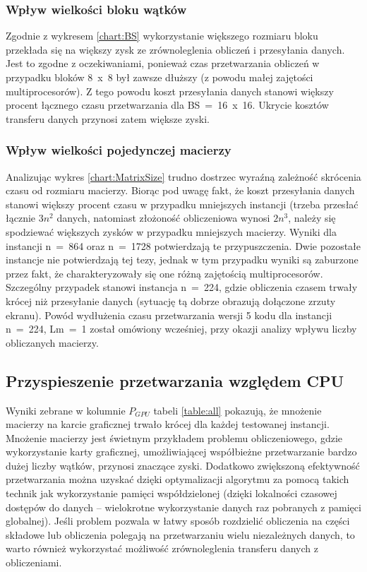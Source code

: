 \documentclass[12pt,a4paper]{article}
\begin{document}
\subsubsection*{Wpływ wielkości bloku wątków}

Zgodnie z wykresem \ref{chart:BS} wykorzystanie większego rozmiaru bloku przekłada się na większy zysk ze zrównoleglenia obliczeń i przesyłania danych. Jest to zgodne z oczekiwaniami, ponieważ czas przetwarzania obliczeń w przypadku bloków 8~x~8 był zawsze dłuższy (z powodu małej zajętości multiprocesorów). Z tego powodu koszt przesyłania danych stanowi większy procent łącznego czasu przetwarzania dla BS~=~16~x~16. Ukrycie kosztów transferu danych przynosi zatem większe zyski.

\subsubsection*{Wpływ wielkości pojedynczej macierzy}

Analizując wykres \ref{chart:MatrixSize} trudno dostrzec wyraźną zależność skrócenia czasu od rozmiaru macierzy. Biorąc pod uwagę fakt, że koszt przesyłania danych stanowi większy procent czasu w przypadku mniejszych instancji (trzeba przesłać łącznie $3n^2$ danych, natomiast złożoność obliczeniowa wynosi $2n^3$, należy się spodziewać większych zysków w przypadku mniejszych macierzy. Wyniki dla instancji n~=~864 oraz n~=~1728 potwierdzają te przypuszczenia. Dwie pozostałe instancje nie potwierdzają tej tezy, jednak w tym przypadku wyniki są zaburzone przez fakt, że charakteryzowały się one różną zajętością multiprocesorów. Szczególny przypadek stanowi instancja n~=~224, gdzie obliczenia czasem trwały krócej niż przesyłanie danych (sytuację tą dobrze obrazują dołączone zrzuty ekranu). Powód wydłużenia czasu przetwarzania wersji 5 kodu dla instancji n~=~224, Lm~=~1 został omówiony wcześniej, przy okazji analizy wpływu liczby obliczanych macierzy.


\subsection{Przyspieszenie przetwarzania względem CPU}

Wyniki zebrane w kolumnie $P_{GPU}$ tabeli \ref{table:all} pokazują, że mnożenie macierzy na karcie graficznej trwało krócej dla każdej testowanej instancji. Mnożenie macierzy jest świetnym przykładem problemu obliczeniowego, gdzie wykorzystanie karty graficznej, umożliwiającej współbieżne przetwarzanie bardzo dużej liczby wątków, przynosi znaczące zyski. Dodatkowo zwiększoną efektywność przetwarzania można uzyskać dzięki optymalizacji algorytmu za pomocą takich technik jak wykorzystanie pamięci współdzielonej (dzięki lokalności czasowej dostępów do danych -- wielokrotne wykorzystanie danych raz pobranych z pamięci globalnej). Jeśli problem pozwala w łatwy sposób rozdzielić obliczenia na części składowe lub obliczenia polegają na przetwarzaniu wielu niezależnych danych, to warto również wykorzystać możliwość zrównoleglenia transferu danych z obliczeniami.
\end{document}

